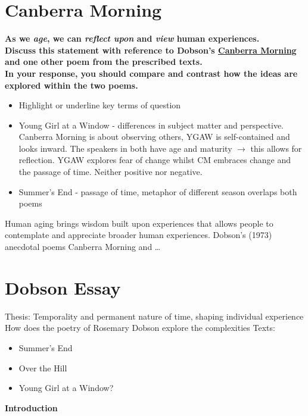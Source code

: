 \section{Canberra Morning} \label{28/11/2024}
	\textbf{As we \textit{age}, we can \textit{reflect upon} and \textit{view} human experiences. \\
	Discuss this statement with reference to Dobson's \underline{Canberra Morning} and one other poem from the prescribed texts. \\
	In your response, you should compare and contrast how the ideas are explored within the two poems.}

	\begin{itemize}
		\item Highlight or underline key terms of question
		\item Young Girl at a Window - differences in subject matter and perspective. Canberra Morning is about observing others, YGAW is self-contained and looks inward. The speakers in both have age and maturity $\rightarrow$ this allows for reflection. YGAW explores fear of change whilst CM embraces change and the passage of time. Neither positive nor negative.
	\item Summer's End - passage of time, metaphor of different season overlaps both poems
	\end{itemize}

	Human aging brings wisdom built upon experiences that allows people to contemplate and appreciate broader human experiences. Dobson's (1973) anecdotal poems Canberra Morning and \dots

\section{Dobson Essay} \label{13/12/2024}
	Thesis: Temporality and permanent nature of time, shaping individual experience
	How does the poetry of Rosemary Dobson explore the complexities
	Texts:
	\begin{itemize}
		\item Summer's End
		\item Over the Hill
		\item Young Girl at a Window?
	\end{itemize}
	
	\textbf{Introduction}


